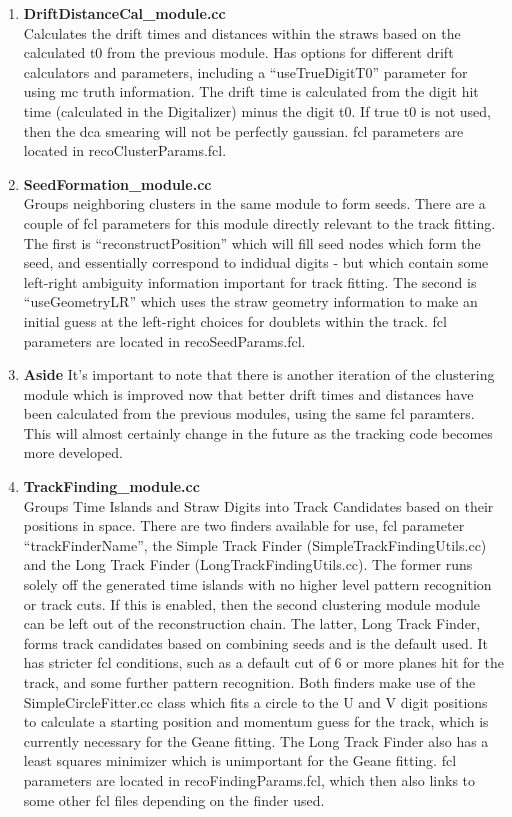 \begin{enumerate}
          \item{\bf{DriftDistanceCal\_module.cc}} \\
          Calculates the drift times and distances within the straws based on the calculated t0 from the previous module. Has options for different drift calculators and parameters, including a ``useTrueDigitT0'' parameter for using mc truth information. The drift time is calculated from the digit hit time (calculated in the Digitalizer) minus the digit t0. If true t0 is not used, then the dca smearing will not be perfectly gaussian. fcl parameters are located in recoClusterParams.fcl.

          \item{\bf{SeedFormation\_module.cc}} \\
          Groups neighboring clusters in the same module to form seeds. There are a couple of fcl parameters for this module directly relevant to the track fitting. The first is ``reconstructPosition'' which will fill seed nodes which form the seed, and essentially correspond to indidual digits - but which contain some left-right ambiguity information important for track fitting. The second is ``useGeometryLR'' which uses the straw geometry information to make an initial guess at the left-right choices for doublets within the track. fcl parameters are located in recoSeedParams.fcl.

          \item{\bf{Aside}}
          It's important to note that there is another iteration of the clustering module which is improved now that better drift times and distances have been calculated from the previous modules, using the same fcl paramters. This will almost certainly change in the future as the tracking code becomes more developed.

          \item{\bf{TrackFinding\_module.cc}} \\
          Groups Time Islands and Straw Digits into Track Candidates based on their positions in space. There are two finders available for use, fcl parameter ``trackFinderName'', the Simple Track Finder (SimpleTrackFindingUtils.cc) and the Long Track Finder (LongTrackFindingUtils.cc). The former runs solely off the generated time islands with no higher level pattern recognition or track cuts. If this is enabled, then the second clustering module module can be left out of the reconstruction chain. The latter, Long Track Finder, forms track candidates based on combining seeds and is the default used. It has stricter fcl conditions, such as a default cut of 6 or more planes hit for the track, and some further pattern recognition. Both finders make use of the SimpleCircleFitter.cc class which fits a circle to the U and V digit positions to calculate a starting position and momentum guess for the track, which is currently necessary for the Geane fitting. The Long Track Finder also has a least squares minimizer which is unimportant for the Geane fitting. fcl parameters are located in recoFindingParams.fcl, which then also links to some other fcl files depending on the finder used.


    \end{enumerate}

